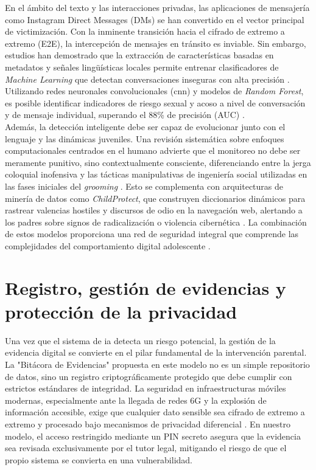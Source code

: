 En el ámbito del texto y las interacciones privadas, las aplicaciones de mensajería como Instagram Direct Messages (DMs) se han convertido en el vector principal de victimización. Con la inminente transición hacia el cifrado de extremo a extremo (E2E), la intercepción de mensajes en tránsito es inviable. Sin embargo, estudios han demostrado que la extracción de características basadas en metadatos y señales lingüísticas locales permite entrenar clasificadores de \textit{Machine Learning} que detectan conversaciones inseguras con alta precisión \cite{ali_getting_2023}. Utilizando redes neuronales convolucionales (\gls{cnn}) y modelos de \textit{Random Forest}, es posible identificar indicadores de riesgo sexual y acoso a nivel de conversación y de mensaje individual, superando el 88\% de precisión (AUC) \cite{razi_sliding_2023}. \\

Además, la detección inteligente debe ser capaz de evolucionar junto con el lenguaje y las dinámicas juveniles. Una revisión sistemática sobre enfoques computacionales centrados en el humano advierte que el monitoreo no debe ser meramente punitivo, sino contextualmente consciente, diferenciando entre la jerga coloquial inofensiva y las tácticas manipulativas de ingeniería social utilizadas en las fases iniciales del \textit{grooming} \cite{razi_human-centered_2021}. Esto se complementa con arquitecturas de minería de datos como \textit{ChildProtect}, que construyen diccionarios dinámicos para rastrear valencias hostiles y discursos de odio en la navegación web, alertando a los padres sobre signos de radicalización o violencia cibernética \cite{ameur_childprotect_2023}. La combinación de estos modelos proporciona una red de seguridad integral que comprende las complejidades del comportamiento digital adolescente \cite{page_psychological_2025}.\\

\section{Registro, gestión de evidencias y protección de la privacidad}

Una vez que el sistema de \gls{ia} detecta un riesgo potencial, la gestión de la evidencia digital se convierte en el pilar fundamental de la intervención parental. La "Bitácora de Evidencias" propuesta en este modelo no es un simple repositorio de datos, sino un registro criptográficamente protegido que debe cumplir con estrictos estándares de integridad. La seguridad en infraestructuras móviles modernas, especialmente ante la llegada de redes 6G y la explosión de información accesible, exige que cualquier dato sensible sea cifrado de extremo a extremo y procesado bajo mecanismos de privacidad diferencial \cite{nguyen_security_2021}. En nuestro modelo, el acceso restringido mediante un PIN secreto asegura que la evidencia sea revisada exclusivamente por el tutor legal, mitigando el riesgo de que el propio sistema se convierta en una vulnerabilidad.\\

